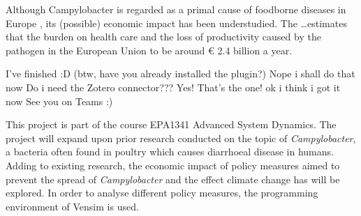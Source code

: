 \iffalse
1.	Establish field  -> Z
    a.	Societal relevance
2.	Outline problem in the field (Elias)
    a.	Scientific relevance
3.	Present solution to problem in the field
    a.	Problem statement/research question -> Z
    b.	Explain relevance of simulation method (Elias) considering the problem
4.	Reading guide -> Z

Target: 1000 words\
♫♪.ılılıll|̲̅̅●̲̅̅|̲̅̅=̲̅̅|̲̅̅●̲̅̅|llılılı.♫♪
\fi

Although Campylobacter is regarded as a primal cause of foodborne diseases in Europe \parencite{european_food_safety_authority_and_european_centre_for_disease_prevention_and_control_efsa_and_ecdc_european_2019}
, its (possible) economic impact has been understudied. The \ldots estimates that the burden on health care and the loss of productivity caused by the pathogen in the European Union to be around \euro{} 2.4 billion a year.  %


I've finished :D (btw, have you already installed the plugin?)
Nope i shall do that now
Do i need the Zotero connector???
Yes! That's the one!
ok i think i got it now
See you on Teams :)


This project is part of the course EPA1341 Advanced System Dynamics. The project will expand upon prior research conducted on the topic of \textit{Campylobacter}, a bacteria often found in poultry which causes diarrhoeal disease in humans. Adding to existing research, the economic impact of policy measures aimed to prevent the spread of  \textit{Campylobacter} and the effect climate change has will be explored. In order to analyse different policy measures, the programming environment of Vensim is used. 

